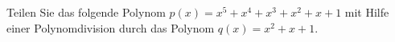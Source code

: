 \begin{ExerciseBlock}
Teilen Sie das folgende Polynom $p(x)=x^5+x^4+x^3+x^2+x+1$ mit Hilfe einer Polynomdivision durch das Polynom $q(x)=x^2+x+1$.

\end{ExerciseBlock}
